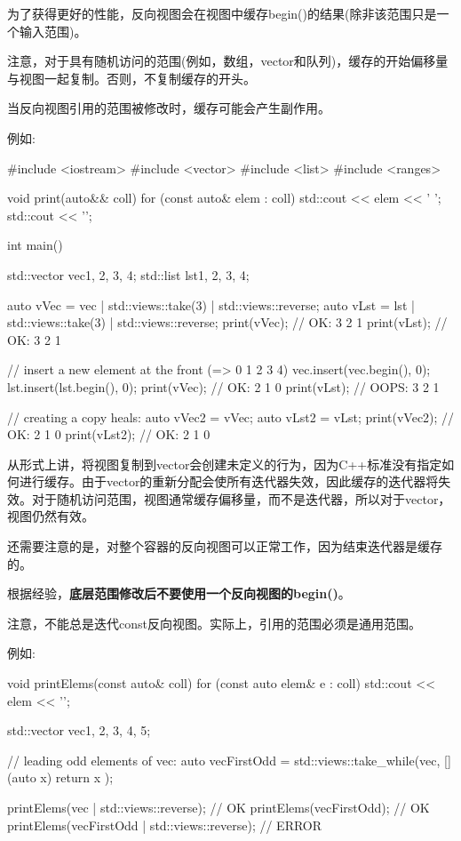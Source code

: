 
为了获得更好的性能，反向视图会在视图中缓存begin()的结果(除非该范围只是一个输入范围)。

注意，对于具有随机访问的范围(例如，数组，vector和队列)，缓存的开始偏移量与视图一起复制。否则，不复制缓存的开头。

当反向视图引用的范围被修改时，缓存可能会产生副作用。

例如:


\begin{cpp}
#include <iostream>
#include <vector>
#include <list>
#include <ranges>

void print(auto&& coll)
{
	for (const auto& elem : coll) {
		std::cout << elem << ' ';
	}
	std::cout << '\n';
}

int main()
{
	std::vector vec{1, 2, 3, 4};
	std::list lst{1, 2, 3, 4};
	
	auto vVec = vec | std::views::take(3) | std::views::reverse;
	auto vLst = lst | std::views::take(3) | std::views::reverse;
	print(vVec); // OK: 3 2 1
	print(vLst); // OK: 3 2 1
	
	// insert a new element at the front (=> 0 1 2 3 4)
	vec.insert(vec.begin(), 0);
	lst.insert(lst.begin(), 0);
	print(vVec); // OK: 2 1 0
	print(vLst); // OOPS: 3 2 1
	
	// creating a copy heals:
	auto vVec2 = vVec;
	auto vLst2 = vLst;
	print(vVec2); // OK: 2 1 0
	print(vLst2); // OK: 2 1 0
}
\end{cpp}

从形式上讲，将视图复制到vector会创建未定义的行为，因为C++标准没有指定如何进行缓存。由于vector的重新分配会使所有迭代器失效，因此缓存的迭代器将失效。对于随机访问范围，视图通常缓存偏移量，而不是迭代器，所以对于vector，视图仍然有效。

还需要注意的是，对整个容器的反向视图可以正常工作，因为结束迭代器是缓存的。

根据经验，\textbf{底层范围修改后不要使用一个反向视图的begin()}。


注意，不能总是迭代const反向视图。实际上，引用的范围必须是通用范围。

例如:

\begin{cpp}
void printElems(const auto& coll) {
	for (const auto elem& e : coll) {
		std::cout << elem << '\n';
	}
}

std::vector vec{1, 2, 3, 4, 5};

// leading odd elements of vec:
auto vecFirstOdd = std::views::take_while(vec, [](auto x) {
						return x %
					});
					
printElems(vec | std::views::reverse); // OK
printElems(vecFirstOdd); // OK
printElems(vecFirstOdd | std::views::reverse); // ERROR
\end{cpp}

